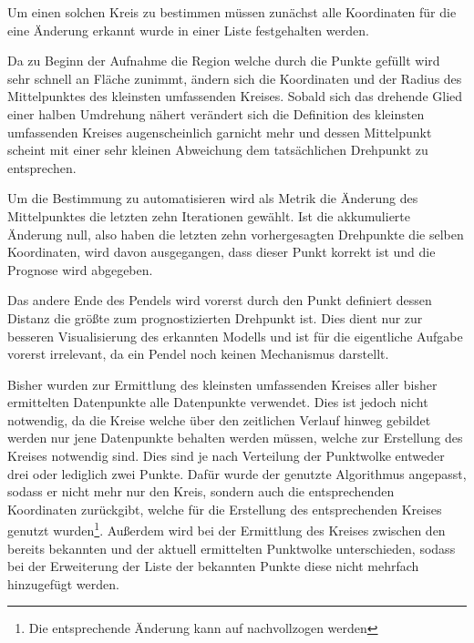 Um einen solchen Kreis zu bestimmen müssen zunächst alle Koordinaten für die eine Änderung erkannt wurde in einer Liste festgehalten werden.

Da zu Beginn der Aufnahme die Region welche durch die Punkte gefüllt wird sehr schnell an Fläche zunimmt, ändern sich die Koordinaten und der Radius des Mittelpunktes des kleinsten umfassenden Kreises.
Sobald sich das drehende Glied einer halben Umdrehung nähert verändert sich die Definition des kleinsten umfassenden Kreises augenscheinlich garnicht mehr und dessen Mittelpunkt scheint mit einer sehr kleinen Abweichung dem tatsächlichen Drehpunkt zu entsprechen.

Um die Bestimmung zu automatisieren wird als Metrik die Änderung des Mittelpunktes die letzten zehn Iterationen gewählt.
Ist die akkumulierte Änderung null, also haben die letzten zehn vorhergesagten Drehpunkte die selben Koordinaten, wird davon ausgegangen, dass dieser Punkt korrekt ist und die Prognose wird abgegeben.

Das andere Ende des Pendels wird vorerst durch den Punkt definiert dessen Distanz die größte zum prognostizierten Drehpunkt ist.
Dies dient nur zur besseren Visualisierung des erkannten Modells und ist für die eigentliche Aufgabe vorerst irrelevant, da ein Pendel noch keinen Mechanismus darstellt.


Bisher wurden zur Ermittlung des kleinsten umfassenden Kreises aller bisher ermittelten Datenpunkte alle Datenpunkte verwendet.
Dies ist jedoch nicht notwendig, da die Kreise welche über den zeitlichen Verlauf hinweg gebildet werden nur jene Datenpunkte behalten werden müssen, welche zur Erstellung des Kreises notwendig sind.
Dies sind je nach Verteilung der Punktwolke entweder drei oder lediglich zwei Punkte.
Dafür wurde der genutzte Algorithmus angepasst, sodass er nicht mehr nur den Kreis, sondern auch die entsprechenden Koordinaten zurückgibt, welche für die Erstellung des entsprechenden Kreises genutzt wurden\footnote{Die entsprechende Änderung kann auf  nachvollzogen werden}.
Außerdem wird bei der Ermittlung des Kreises zwischen den bereits bekannten und der aktuell ermittelten Punktwolke unterschieden, sodass bei der Erweiterung der Liste der bekannten Punkte diese nicht mehrfach hinzugefügt werden.

